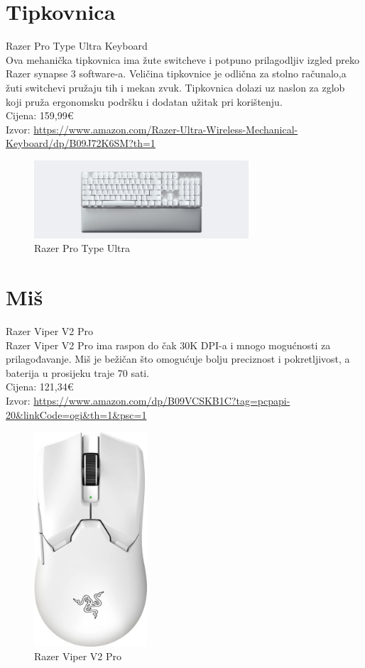 \documentclass{report}
\begin{document}
\chapter{Tipkovnica}
Razer Pro Type Ultra Keyboard
\\Ova mehanička tipkovnica ima žute switcheve i potpuno prilagodljiv izgled preko Razer synapse 3 software-a. Veličina tipkovnice je odlična za stolno računalo,a žuti switchevi pružaju tih i mekan zvuk. Tipkovnica dolazi uz naslon za zglob koji pruža ergonomsku podršku i dodatan užitak pri korištenju.
\\Cijena: 159,99€
\\Izvor:  \url{https://www.amazon.com/Razer-Ultra-Wireless-Mechanical-Keyboard/dp/B09J72K6SM?th=1}
\begin{figure}[h]
\includegraphics[width=8cm]{tipkovnica.jpg}
\caption{Razer Pro Type Ultra}
\end{figure}

\chapter{Miš}
Razer Viper V2 Pro
\\Razer Viper V2 Pro ima raspon do čak 30K DPI-a i mnogo mogućnosti za prilagođavanje. Miš je bežičan što omogućuje bolju preciznost i pokretljivost, a baterija u prosijeku traje 70 sati.
\\Cijena: 121,34€
\\Izvor:  \url{https://www.amazon.com/dp/B09VCSKB1C?tag=pcpapi-20&linkCode=ogi&th=1&psc=1}
\begin{figure}[h]
\includegraphics[height=8cm]{mis.jpg}
\caption{Razer Viper V2 Pro}
\end{figure}
\end{document}

